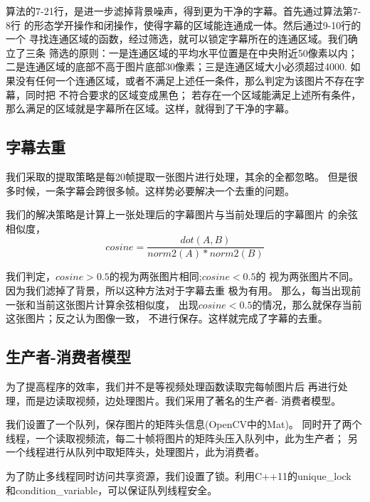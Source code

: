 \documentclass{article}
\begin{document}
                算法的7-21行，是进一步滤掉背景噪声，得到更为干净的字幕。首先通过算法第7-8行
                的形态学开操作和闭操作，使得字幕的区域能连通成一体。然后通过9-10行的一个
                寻找连通区域的函数，经过筛选，就可以锁定字幕所在的连通区域。我们确立了三条
                筛选的原则：一是连通区域的平均水平位置是在中央附近50像素以内；
                二是连通区域的底部不高于图片底部30像素；三是连通区域大小必须超过4000.
                如果没有任何一个连通区域，或者不满足上述任一条件，那么判定为该图片不存在字幕，同时把
                不符合要求的区域变成黑色；
                若存在一个区域能满足上述所有条件，那么满足的区域就是字幕所在区域。这样，就得到了干净的字幕。


            \subsection{字幕去重}
                我们采取的提取策略是每20帧提取一张图片进行处理，其余的全都忽略。
                但是很多时候，一条字幕会跨很多帧。这样势必要解决一个去重的问题。

                我们的解决策略是计算上一张处理后的字幕图片与当前处理后的字幕图片
                的余弦相似度，
                \begin{equation}
                    cosine = \frac{dot(A,B)}{norm2(A)*norm2(B)}
                \end{equation}

                我们判定，$cosine > 0.5$的视为两张图片相同;$cosine < 0.5$的
                视为两张图片不同。因为我们滤掉了背景，所以这种方法对于字幕去重
                极为有用。
                那么，每当出现前一张和当前这张图片计算余弦相似度，
                出现$cosine < 0.5$的情况，那么就保存当前这张图片；反之认为图像一致，
                不进行保存。这样就完成了字幕的去重。
            \subsection{生产者-消费者模型}
                为了提高程序的效率，我们并不是等视频处理函数读取完每帧图片后
                再进行处理，而是边读取视频，边处理图片。我们采用了著名的生产者-
                消费者模型。

                我们设置了一个队列，保存图片的矩阵头信息(OpenCV中的Mat)。
                同时开了两个线程，一个读取视频流，每二十帧将图片的矩阵头压入队列中，此为生产者；
                另一个线程进行从队列中取矩阵头，处理图片，此为消费者。

                为了防止多线程同时访问共享资源，我们设置了锁。利用C++11的unique\_lock
                和condition\_variable，可以保证队列线程安全。
\end{document}
